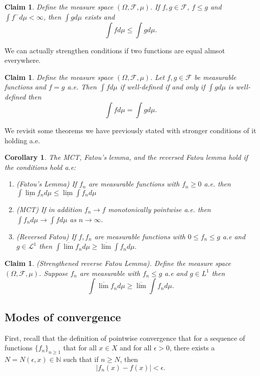 \documentclass[twoside]{article}
\newtheorem{claim}[theorem]{Claim}
\newtheorem{corollary}[theorem]{Corollary}
\newcommand{\sigmalgebra}{\mathcal{F}}
\begin{document}
\begin{claim}Define the measure space $(\Omega, \sigmalgebra, \mu)$. If $f, g\in \sigmalgebra$, $f \leq g$ and $\int f^{-}d\mu < \infty$, then $\int gd\mu$ exists and 
$$
\int fd\mu \leq \int gd\mu.
$$
\end{claim}

We can actually strengthen conditions if two functions are equal almsot everywhere.

\begin{claim}Define the measure space $(\Omega, \sigmalgebra, \mu)$. Let $f, g \in \mathcal{F}$ be measurable functions and $f = g$ a.e. Then $\int fd\mu$ if well-defined if and only if $\int gd\mu$ is well-defined then 
$$
\int fd\mu = \int gd\mu.
$$
\end{claim}

We revisit some theorems we have previously stated with stronger conditions of it holding a.e.

\begin{corollary}The MCT, Fatou's lemma, and the reversed Fatou lemma hold if the conditions hold a.e:
\begin{enumerate}
\item (Fatou's Lemma) If $f_n$ are measurable functions with $f_n \geq 0$ a.e. then $\int \underline{\lim}f_nd\mu \leq \underline{\lim}\int f_nd\mu$
\item (MCT) If in addition $f_n \rightarrow f$ monotonically pointwise a.e. then $\int f_nd\mu \rightarrow \int fd\mu$ as $n \rightarrow \infty.$
\item (Reversed Fatou) If $f, f_n$ are measurable functions with $0 \leq f_n \leq g$ a.e and $g \in \mathcal{L}^1$ then $\int \overline{\lim}f_nd\mu \geq \overline{\lim}\int f_nd\mu.$
\end{enumerate}
\end{corollary}


\begin{claim}(Strengthened reverse Fatou Lemma). Define the measure space $(\Omega, \sigmalgebra, \mu)$. Suppose $f_n$ are measurable with $f_n \leq g$ a.e and $g \in L^1$ then 
$$
\int \overline{\lim}f_nd\mu \geq \overline{\lim}\int f_nd\mu.
$$
\end{claim}

\subsection{Modes of convergence}

First, recall that the definition of pointwise convergence that for a sequence of functions $\{f_n\}_{n \geq 1}$ that for all $x \in X$ and for all $\epsilon > 0$, there exists a $N = N(\epsilon, x) \in \mathbb{N}$ such that if $n \geq N$, then 
$$
|f_n(x) - f(x)| < \epsilon.
$$
\end{document}
